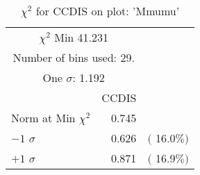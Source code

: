  \begin{table}[h!]\centering
 {\small{
 \begin{tabular}{||l||r||r||}
 \hline
 \hline
\multicolumn{2}{||c||}{$\chi^{2}$ Min  41.231} & \\
 \multicolumn{2}{||c||}{Number of bins used:   29.} & \\
\multicolumn{2}{||c||}{One $\sigma$:    1.192} & \\
 \hline
 \hline
    & CCDIS & \\
Norm at Min $\chi^{2}$  &   0.745 & \\
$-1$ $\sigma$ &   0.626  &  $($ 16.0$\%)$  \\
$+1$ $\sigma$ &   0.871  &  $($ 16.9$\%)$  \\
 \hline
 \hline
 \end{tabular}
 \caption{$\chi^{2}$ for CCDIS on plot: 'Mmumu'}
 \label{tab-chiccdis}
 }}
 \end{table}
 \endinput
